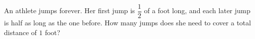 An athlete jumps forever. Her first jump is $\dfrac12$ of a foot long, and each later jump is half as long as the one before. How many jumps does she need to cover a total distance of $1$ foot?
